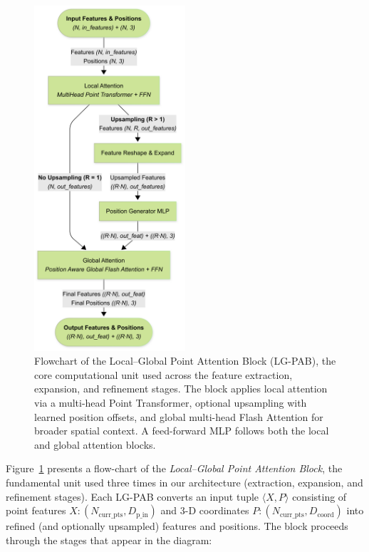 \documentclass[remotesensing,article,submit,pdftex,moreauthors]{Definitions/mdpi}
\begin{document}
\begin{figure}[!b]
  \centering
  \includegraphics[trim=0mm 0mm 36mm 0mm, clip, width=0.5\textwidth]{manuscript/figures/LG-PAB.png}
  \caption{Flowchart of the Local–Global Point Attention Block (LG-PAB), the core computational unit used across the feature extraction, expansion, and refinement stages. The block applies local attention via a multi-head Point Transformer, optional upsampling with learned position offsets, and global multi-head Flash Attention for broader spatial context. A feed-forward MLP follows both the local and global attention blocks.}
  \label{fig:lgpab}
\end{figure}

Figure~\ref{fig:lgpab} presents a flow-chart of the \emph{Local–Global Point Attention Block}, the fundamental unit used three times in our architecture (extraction, expansion, and refinement stages).
Each LG-PAB converts an input tuple $\langle X, P \rangle$ consisting of point features $X: (N_{\text{curr\_pts}}, D_{\text{p\_in}})$ and 3-D coordinates $P: (N_{\text{curr\_pts}}, D_{\text{coord}})$ into refined (and optionally upsampled) features and positions. The block proceeds through the stages that appear in the diagram:
\end{document}
